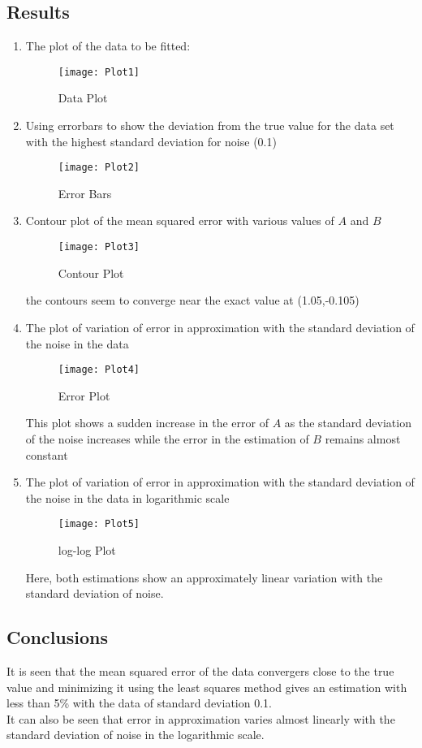\documentclass[12pt, a4paper]{report}
\begin{document}
\subsection*{Results}
\begin{enumerate}
\item The plot of the data to be fitted:
\begin{figure}[H]
	\texttt{[image: Plot1]} 
	\caption{Data Plot}
	\label{fig:rawdata}
\end{figure}
\clearpage

\item Using errorbars to show the deviation from the true value for the data set with the highest standard deviation for noise (0.1)
\begin{figure}[H]
	\texttt{[image: Plot2]}
	\caption{Error Bars}
	\label{fig:errobars}
\end{figure}

\item Contour plot of the mean squared error with various values of $A$ and $B$
\begin{figure}[H]
	\texttt{[image: Plot3]}
	\caption{Contour Plot}
	\label{fig:contour}
\end{figure}
the contours seem to converge near the exact value at (1.05,-0.105)
\clearpage
\item The plot of variation of error in approximation with the standard deviation of the noise in the data
\begin{figure}[H]
	\texttt{[image: Plot4]}
	\caption{Error Plot}
	\label{fig:eplot}
\end{figure}
This plot shows a sudden increase in the error of $A$ as the standard deviation of the noise increases while the error in the estimation of $B$ remains almost constant

\item The plot of variation of error in approximation with the standard deviation of the noise in the data in logarithmic scale
\begin{figure}[H]
	\texttt{[image: Plot5]}
	\caption{log-log Plot}
	\label{fig:logplota}
\end{figure}
Here, both estimations show an approximately linear variation with the standard deviation of noise.
\end{enumerate}

\subsection*{Conclusions}
It is seen that the mean squared error of the data convergers close to the true value and minimizing it using the least squares method gives an estimation with less than 5\% with the data of standard deviation 0.1.\\
It can also be seen that error in approximation varies almost linearly with the standard deviation of noise in the logarithmic scale.
\end{document}

